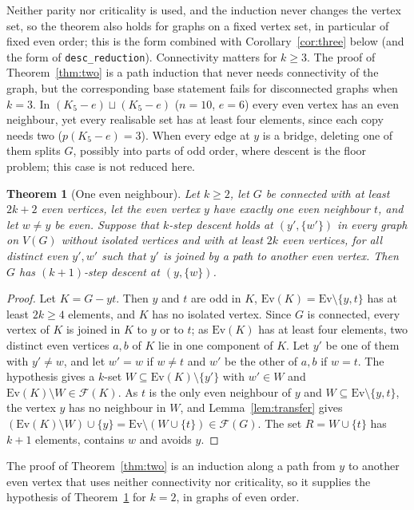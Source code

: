 \documentclass[11pt]{amsart}
\newtheorem{theorem}{Theorem}
\theoremstyle{definition}
\newcommand{\cF}{\mathcal F}
\newcommand{\Ev}{\mathrm{Ev}}
\begin{document}
Neither parity nor criticality is used, and the induction never changes the vertex set, so the
theorem also holds for graphs on a fixed vertex set, in particular of fixed even order; this is the
form combined with Corollary~\ref{cor:three} below (and the form of \texttt{desc\_reduction}).
Connectivity matters for $k\ge3$. The proof of
Theorem~\ref{thm:two} is a path induction that never needs connectivity of the graph, but the
corresponding base statement fails for disconnected graphs when $k=3$. In $(K_5-e)\sqcup(K_5-e)$
($n=10$, $e=6$) every even vertex has an even neighbour, yet every realisable set has at least four
elements, since each copy needs two ($p(K_5-e)=3$). When every edge at $y$ is a bridge, deleting one
of them splits $G$, possibly into parts of odd order, where descent is the floor problem; this case
is not reduced here.

\begin{theorem}[One even neighbour]\label{thm:unique}
Let $k\ge2$, let $G$ be connected with at least $2k+2$ even vertices, let the even vertex $y$ have
exactly one even neighbour $t$, and let $w\ne y$ be even. Suppose that $k$-step descent holds at
$(y',\{w'\})$ in every graph on $V(G)$ without isolated vertices and with at least $2k$ even vertices, for all
distinct even $y',w'$ such that $y'$ is joined by a path to another even vertex. Then $G$ has
$(k+1)$-step descent at $(y,\{w\})$.
\end{theorem}

\begin{proof}
Let $K=G-yt$. Then $y$ and $t$ are odd in $K$, $\Ev(K)=\Ev\setminus\{y,t\}$ has at least $2k\ge4$
elements, and $K$ has no isolated vertex. Since $G$ is connected, every vertex of $K$ is joined in $K$
to $y$ or to $t$; as $\Ev(K)$ has at least four elements, two distinct even vertices $a,b$ of $K$ lie
in one component of $K$. Let $y'$ be
one of them with $y'\ne w$, and let $w'=w$ if $w\ne t$ and $w'$ be the other of $a,b$ if $w=t$. The
hypothesis gives a $k$-set $W\subseteq\Ev(K)\setminus\{y'\}$ with $w'\in W$ and
$\Ev(K)\setminus W\in\cF(K)$. As $t$ is the only even neighbour of $y$ and $W\subseteq\Ev\setminus\{y,t\}$,
the vertex $y$ has no neighbour in $W$, and Lemma~\ref{lem:transfer} gives
$(\Ev(K)\setminus W)\cup\{y\}=\Ev\setminus(W\cup\{t\})\in\cF(G)$. The set $R=W\cup\{t\}$ has $k+1$
elements, contains $w$ and avoids $y$.
\end{proof}

The proof of Theorem~\ref{thm:two} is an induction along a path from $y$ to another even vertex that
uses neither connectivity nor criticality, so it supplies the hypothesis of Theorem~\ref{thm:unique}
for $k=2$, in graphs of even order.
\end{document}
